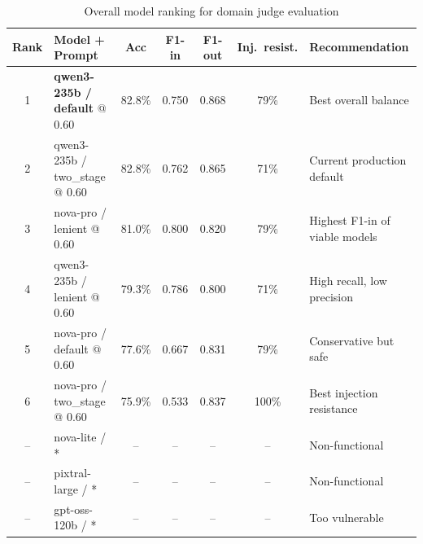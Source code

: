 
\begin{table}[ht]
\centering
\caption{Overall model ranking for domain judge evaluation}
\label{tab:model-ranking}
\begin{tabular}{clccccp{4cm}}
\toprule
Rank & Model + Prompt & Acc & F1-in & F1-out & Inj.\ resist. & Recommendation \\
\midrule
1 & \textbf{qwen3-235b / default} @ 0.60  & 82.8\% & 0.750 & 0.868 & 79\%  & Best overall balance \\
2 & qwen3-235b / two\_stage @ 0.60        & 82.8\% & 0.762 & 0.865 & 71\%  & Current production default \\
3 & nova-pro / lenient @ 0.60              & 81.0\% & 0.800 & 0.820 & 79\%  & Highest F1-in of viable models \\
4 & qwen3-235b / lenient @ 0.60            & 79.3\% & 0.786 & 0.800 & 71\%  & High recall, low precision \\
5 & nova-pro / default @ 0.60              & 77.6\% & 0.667 & 0.831 & 79\%  & Conservative but safe \\
6 & nova-pro / two\_stage @ 0.60           & 75.9\% & 0.533 & 0.837 & 100\% & Best injection resistance \\
\midrule
-- & nova-lite / *                          & --     & --    & --    & --    & Non-functional \\
-- & pixtral-large / *                      & --     & --    & --    & --    & Non-functional \\
-- & gpt-oss-120b / *                       & --     & --    & --    & --    & Too vulnerable \\
\bottomrule
\end{tabular}
\end{table}




